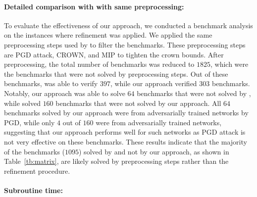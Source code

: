 \paragraph{Detailed comparison with \alphabeta{} with same preprocessing: } 
To evaluate the effectiveness of our approach, we conducted a benchmark analysis on the instances where 
refinement was applied. We applied the same preprocessing steps used by \alphabeta{} to filter the benchmarks.
These preprocessing steps are PGD attack, CROWN, and MIP to tighten the crown bounds. 
After preprocessing, the total number of benchmarks was reduced to $1825$, which were the benchmarks that were not 
solved by preprocessing steps. Out of these benchmarks, \alphabeta{} was able to verify $397$, 
while our approach verified 
$303$ benchmarks. Notably, our approach was able to solve $64$ benchmarks that were not solved by \alphabeta{}, 
while \alphabeta{} solved $160$ benchmarks that were not solved by our approach. 
All $64$ benchmarks solved by our approach were from adversarially trained networks by PGD, 
while only $4$ out of $160$ were from adversarially trained networks, suggesting that our approach performs 
well for such networks as PGD attack is not very effective on these benchmarks. 
These results indicate that the majority of the benchmarks ($1095$) solved by \alphabeta{} and not by our approach, 
as shown in Table~\ref{tb:matrix}, are likely solved by preprocessing steps rather than the refinement procedure.


\paragraph{Subroutine time: }


